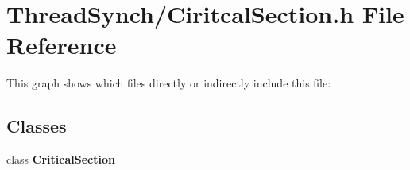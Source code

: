\section{Thread\-Synch/Ciritcal\-Section.h File Reference}
\label{_ciritcal_section_8h}


This graph shows which files directly or indirectly include this file:\subsection*{Classes}
\begin{CompactItemize}
\item 
class {\bf Critical\-Section}
\end{CompactItemize}
